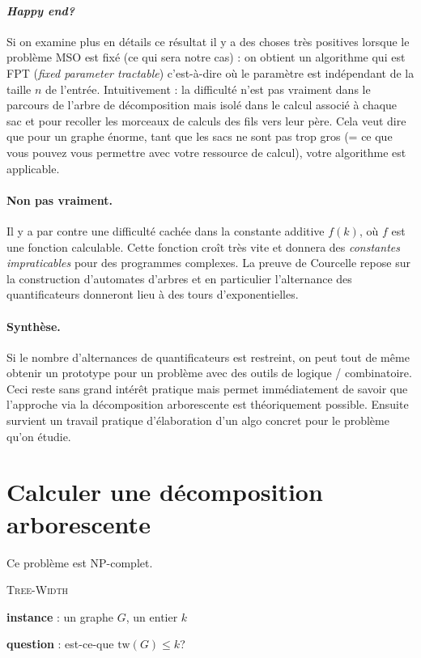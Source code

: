 \documentclass[a4paper,12pt]{article}
\theoremstyle{definition}
\theoremstyle{remark}
\newcommand{\tw}[1]{\ensuremath{\mathrm{tw}(#1)}}
\begin{document}
\paragraph{\textsl{Happy end?}}
Si on examine plus en détails ce résultat il y a des choses très
positives lorsque le problème MSO est fixé (ce qui sera notre cas) :
on obtient un algorithme qui est FPT (\emph{fixed parameter
  tractable}) c'est-à-dire où le paramètre est indépendant de la
taille $n$ de l'entrée. Intuitivement : la difficulté n'est pas
vraiment dans le parcours de l'arbre de décomposition mais isolé dans
le calcul associé à chaque sac et pour
recoller les morceaux de calculs des fils vers leur père. Cela veut
dire que pour un graphe énorme, tant que les sacs ne sont pas trop
gros (= ce que vous pouvez vous permettre avec votre ressource de
calcul), votre algorithme est applicable.

\paragraph{Non pas vraiment.}
Il y a par contre une difficulté cachée dans la constante additive
$f(k)$, où $f$ est une fonction calculable. Cette fonction croît très
vite et donnera des \emph{constantes impraticables} pour des programmes
complexes. La preuve de Courcelle repose sur la construction
d'automates d'arbres et en particulier l'alternance des
quantificateurs donneront lieu à des tours d'exponentielles.

\paragraph{Synthèse.} Si le nombre d'alternances de quantificateurs est
restreint, on peut tout de même obtenir un prototype pour un problème avec des
outils de logique / combinatoire. Ceci reste sans grand intérêt
pratique mais permet immédiatement de savoir que l'approche via la
décomposition arborescente est théoriquement possible. Ensuite
survient un travail pratique d'élaboration d'un algo concret pour le
problème qu'on étudie.  

\section{Calculer une décomposition arborescente}

Ce problème est NP-complet.

\begin{framed}\textsc{Tree-Width}
  \begin{compactitem}
  \item \textbf{instance} : un graphe $G$, un entier $k$
  \item \textbf{question} : est-ce-que $\tw{G}\leq k$? 
  \end{compactitem}
\end{framed}
\end{document}
